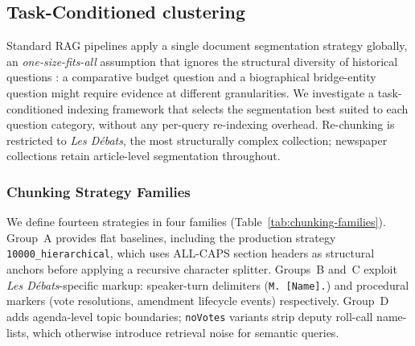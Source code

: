 



\subsection{Task-Conditioned clustering}
\label{sec:indexing-methodology}

Standard RAG pipelines apply a single document segmentation strategy globally, an \emph{one-size-fits-all} assumption that ignores the structural diversity of
historical questions : a comparative budget question and a biographical bridge-entity question might require evidence at different granularities.
We investigate a task-conditioned indexing framework that selects the
segmentation best suited to each question category, without any per-query
re-indexing overhead.
Re-chunking is restricted to \textit{Les Débats}, the most structurally complex
collection; newspaper collections retain article-level segmentation throughout.

\subsubsection{Chunking Strategy Families}
\label{sec:chunking-families}

We define fourteen strategies in four families (Table~\ref{tab:chunking-families}).
Group~A provides flat baselines, including the production strategy
\texttt{10000\_hierarchical}, which uses ALL-CAPS section headers as structural
anchors before applying a recursive character splitter.
Groups~B and~C exploit \textit{Les Débats}-specific markup: speaker-turn
delimiters (\texttt{M.~[Name].}) and procedural markers (vote resolutions,
amendment lifecycle events) respectively.
Group~D adds agenda-level topic boundaries; \texttt{noVotes} variants strip
deputy roll-call name-lists, which otherwise introduce retrieval noise for
semantic queries.


